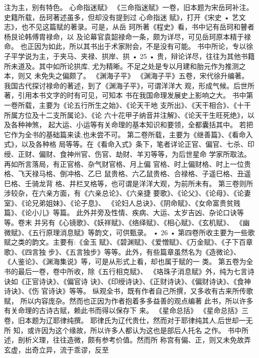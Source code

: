 注为主，别有特色。
心命指迷赋》
《三命指迷赋》一卷，旧本题为宋岳珂补注。
史籍所载，岳珂著述虽多，但却没有提到过 心命指迷
赋》，打开《宋史 • 艺文志》，也不见这篇赋的著录。可是，从岳
珂所著《程史》看，书中记有岳珂和瞽者杨艮论韩傅胄禄命，以
及论幕官袁韶禄命一条，颇为详尽，可见岳珂原本精于禄命。
也正因为如此，所以其书出于术家附会，不是没有可能。
书中所论，专以徐子平学说为主，于夹马、夹禄、拱岸、拱
• 25 •
贵，辩论详尽，往往为其他书籍所未道及。其中如所论拱库,
尤为精晰。不足之处是专以月建和胎元作为推测之本，则又
未免失之偏颇了。
《渊海子平》
《渊海子平》五卷，宋代徐升编著。
我国古代探讨禄命的著述，到了《渊海子平》，可谓洋洋大
观，形成气候。后世所著，引用本书文字的时有可见，可知本
书在我国命理发展史上影响之大。
书中第一卷所载，主要为《论五行所生之始》、《论天干地
支所出》、《天干相合》、《十干所属方位及十二支所属论》、《论
六十花甲子纳音并注解》、《论天干生旺死绝》，以及各种神煞，
起大运、小运等有关命理的基本知识和要领，全都囊括其中。
若把它作为全书的基础篇来读,也未尝不可。
第二卷所载，主要为《继善篇》、《看命入式》，以及各种格
局等等。在《看命入式》条下，笔者详论正官、偏官、七杀、印
绶、正财、偏财、食神州官、伤官、劫财、羊刃等等，为后世星命
学家所取法。再如所言落局，有正官格、杂气财官格、月上偏
官格、时上偏财格、时上一位贵格、飞天禄马格、倒冲格、乙巳
鼠贵格、六乙鼠贵格、合禄格、子遥巳格、丑遥巳格、壬骑龙背
格、井栏叉格等，也可谓是洋洋大观，为前所未有。
第三卷则所涉较杂，在六亲方面，有《六亲总论》、《六亲捷
要歌》、《论父》、《论母》、《论妻室》、《论兄弟姐妹》、《论子息》、
《论妇人总诀》、《阴命赋》、《女命富贵贫贱篇》、《论小儿》等篇。
此外并旁及性情、疾病、大运、太岁吉凶、杂论口诀等等。卷末
并另有《心镜歌》、《妖祥赋》、《络绎赋》、《相心赋》、《玄机赋》、
《幽微赋》、《五行原理消息赋》等韵文，可供甄录。
• 26 •
第四卷所收主要为一些歌赋之类的韵文。主要有:《金玉
赋》、《碧渊赋》、《爱憎赋》、《万金赋》、《子下百章歌》、《四言独
步》、《五言独步》等等。此外，有些篇章虽然名为《造微论》、
《人鉴论》、《渊海集说》等，可是从形式上看，却也属于赋的一
类。
第五卷为全书的最后一卷，卷中所收，除《五行相克赋》、
《珞珠子消息赋》外，纯为七言诗诀如《正官诗诀》、《偏官诗
诀》、《印绶诗诀》、《正财诗诀》、《偏财诗诀》、《食神诗诀》、《伤
官诗诀》等等。
纵观全书，既有作者自己所撰，又多收有古来所传歌赋，
所以内容庞杂。然而也正因为作者抱着多多益善的观点编著
此书，所以许多有关命理的古诗古赋，赖此书而得以保存下
来。
《星命总括》
《星命总括》三卷，旧本题为辽耶律纯撰。
耶律氏为辽代贵仕，然而对于耶律纯其人,后世却一无所
知，或许因为这个缘故，所以许多人都认为这也是部后人托名
之作。
书中所述，剖析义理，往往造微，颇有参考价值。然而所
称宫有偏、正，则又未免故弄玄虚，出奇立异，流于乖谬，反至
